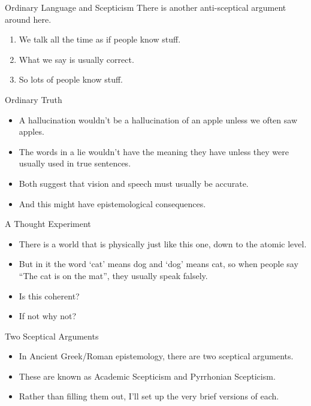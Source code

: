 \documentclass[
  17pt,
  letterpaper,
  ignorenonframetext,
  aspectratio=169,
]{beamer}
\providecommand{\tightlist}{%
  \setlength{\itemsep}{0pt}\setlength{\parskip}{0pt}}\usepackage{longtable,booktabs,array}
\begin{document}
\begin{frame}{Ordinary Language and Scepticism}
\protect\hypertarget{ordinary-language-and-scepticism}{}
There is another anti-sceptical argument around here.

\begin{enumerate}[<+->]
\tightlist
\item
  We talk all the time as if people know stuff.
\item
  What we say is usually correct.
\item
  So lots of people know stuff.
\end{enumerate}
\end{frame}

\begin{frame}{Ordinary Truth}
\protect\hypertarget{ordinary-truth}{}
\begin{itemize}[<+->]
\tightlist
\item
  A hallucination wouldn't be a hallucination of an apple unless we
  often saw apples.
\item
  The words in a lie wouldn't have the meaning they have unless they
  were usually used in true sentences.
\item
  Both suggest that vision and speech must usually be accurate.
\item
  And this might have epistemological consequences.
\end{itemize}
\end{frame}

\begin{frame}{A Thought Experiment}
\protect\hypertarget{a-thought-experiment}{}
\begin{itemize}[<+->]
\tightlist
\item
  There is a world that is physically just like this one, down to the
  atomic level.
\item
  But in it the word `cat' means dog and `dog' means cat, so when people
  say ``The cat is on the mat'', they usually speak falsely.
\item
  Is this coherent?
\item
  If not why not?
\end{itemize}
\end{frame}

\begin{frame}{Two Sceptical Arguments}
\protect\hypertarget{two-sceptical-arguments}{}
\begin{itemize}[<+->]
\tightlist
\item
  In Ancient Greek/Roman epistemology, there are two sceptical
  arguments.
\item
  These are known as Academic Scepticism and Pyrrhonian Scepticism.
\item
  Rather than filling them out, I'll set up the very brief versions of
  each.
\end{itemize}
\end{frame}
\end{document}
